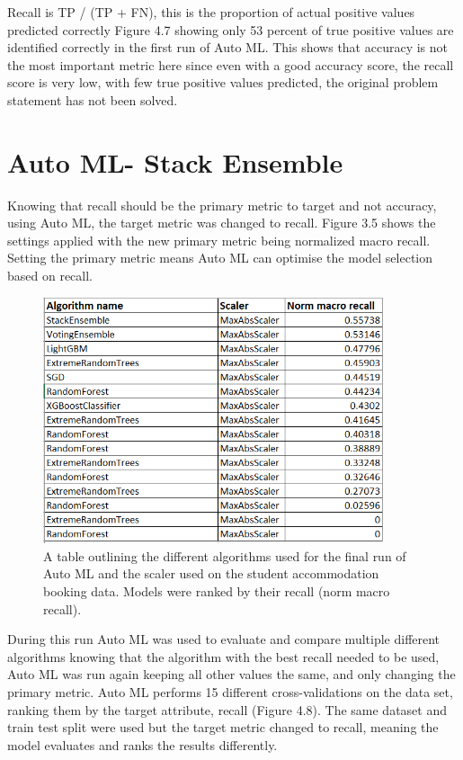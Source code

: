 Recall is TP / (TP + FN), this is the proportion of actual positive values predicted correctly Figure 4.7 showing only 53 percent of true positive values are identified correctly in the first run of Auto ML. This shows that accuracy is not the most important metric here since even with a good accuracy score, the recall score is very low, with few true positive values predicted, the original problem statement has not been solved. 

\section{Auto ML- Stack Ensemble}

Knowing that recall should be the primary metric to target and not accuracy, using Auto ML, the target metric was changed to recall. Figure 3.5 shows the settings applied with the new primary metric being normalized macro recall. Setting the primary metric means Auto ML can optimise the model selection based on recall.

 \begin{figure}[H]
 \centering
\includegraphics[width=10cm]{figures/auto_ml_final_models.png}
 \caption{A table outlining the different algorithms used for the final run of Auto ML and the scaler used on the student accommodation booking data. Models were ranked by their recall (norm macro recall).}
\end{figure}

During this run Auto ML was used to evaluate and compare multiple different algorithms knowing that the algorithm with the best recall needed to be used, Auto ML was run again keeping all other values the same, and only changing the primary metric. Auto ML performs 15 different cross-validations on the data set, ranking them by the target attribute, recall (Figure 4.8). The same dataset and train test split were used but the target metric changed to recall,  meaning the model evaluates and ranks the results differently.


